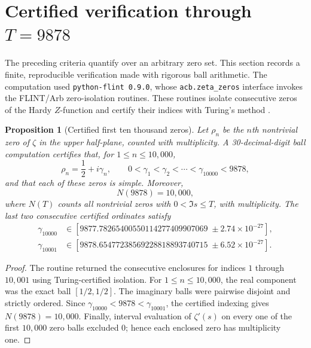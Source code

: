 \documentclass[11pt]{article}
\newtheorem{proposition}[definition]{Proposition}
\begin{document}
\section{Certified verification through $T=9878$}
The preceding criteria quantify over an arbitrary zero set.  This section records a finite,
reproducible verification made with rigorous ball arithmetic.  The computation used
\texttt{python-flint 0.9.0}, whose \texttt{acb.zeta\_zeros} interface invokes the FLINT/Arb
zero-isolation routines.  These routines isolate consecutive zeros of the Hardy $Z$-function
and certify their indices with Turing's method \cite{AriasPrograms,FLINTzeros}.

\begin{proposition}[Certified first ten thousand zeros]\label{prop:certified-10000}
Let $\rho_n$ be the $n$th nontrivial zero of $\zeta$ in the upper half-plane, counted with
multiplicity.  A 30-decimal-digit ball computation certifies that, for
$1\le n\le10{,}000$,
\begin{equation}\label{eq:certified-10000}
 \rho_n=\frac12+i\gamma_n,\qquad
 0<\gamma_1<\gamma_2<\cdots<\gamma_{10000}<9878,
\end{equation}
and that each of these zeros is simple.  Moreover,
\begin{equation}\label{eq:certified-height-count}
 N(9878)=10{,}000,
\end{equation}
where $N(T)$ counts all nontrivial zeros with $0<\Im s\le T$, with multiplicity.
The last two consecutive certified ordinates satisfy
\begin{align}
 \gamma_{10000}&\in
 [9877.78265400550114277409907069\;\pm2.74\times10^{-27}],\label{eq:gamma-10000}\\
 \gamma_{10001}&\in
 [9878.65477238569228818893740715\;\pm6.52\times10^{-27}].\label{eq:gamma-10001}
\end{align}
\end{proposition}

\begin{proof}
The routine returned the consecutive enclosures for indices $1$ through $10{,}001$ using
Turing-certified isolation.  For $1\le n\le10{,}000$, the real component was the exact ball
$[1/2,1/2]$.  The imaginary balls were pairwise disjoint and strictly ordered.  Since
$\gamma_{10000}<9878<\gamma_{10001}$, the certified indexing gives
$N(9878)=10{,}000$.  Finally, interval evaluation of $\zeta'(s)$ on every one of the first
$10{,}000$ zero balls excluded $0$; hence each enclosed zero has multiplicity one.
\end{proof}
\end{document}
